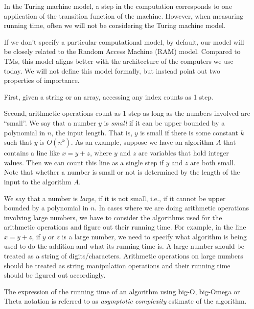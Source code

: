 \begin{important}
\label{important:Our-model-when-measuring-running-time}
In the Turing machine model, a step in the computation corresponds to one application of the transition function of the machine. However, when measuring running time, often we will not be considering the Turing machine model.

If we don't specify a particular computational model, by default, our model will be closely related to the Random Access Machine (RAM) model. Compared to TMs, this model aligns better with the architecture of the computers we use today. We will not define this model formally, but instead point out two properties of importance. 

First, given a string or an array, accessing any index counts as 1 step. 

Second, arithmetic operations count as 1 step as long as the numbers involved are ``small''. We say that a number $y$ is \emph{small} if it can be upper bounded by a polynomial in $n$, the input length. That is, $y$ is small if there is some constant $k$ such that $y$ is $O(n^k)$. As an example, suppose we have an algorithm $A$ that contains a line like $x = y + z$, where $y$ and $z$ are variables that hold integer values. Then we can count this line as a single step if $y$ and $z$ are both small. Note that whether a number is small or not is determined by the length of the input to the algorithm $A$.

We say that a number is \emph{large}, if it is not small, i.e., if it cannot be upper bounded by a polynomial in $n$. In cases where we are doing arithmetic operations involving large numbers, we have to consider the algorithms used for the arithmetic operations and figure out their running time. For example, in the line $x = y + z$, if $y$ or $z$ is a large number, we need to specify what algorithm is being used to do the addition and what its running time is. A large number should be treated as a string of digits/characters. Arithmetic operations on large numbers should be treated as string manipulation operations and their running time should be figured out accordingly.

\end{important}

\begin{note}
\label{note:Asymptotic-complexity}
The expression of the running time of an algorithm using big-O, big-Omega or Theta notation is referred to as \emph{asymptotic complexity}  estimate of the algorithm.

\end{note}

